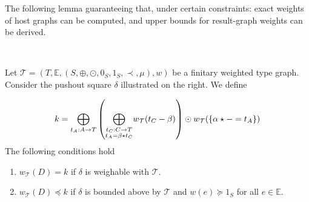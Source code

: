 The following lemma guaranteeing that, under certain constraints: exact weights of host graphs can be computed, and upper bounds for result-graph weights can be derived. 
\begin{lemma}
    \label{nwf:lem_4d13}
\ \newline
\begin{minipage}{0.7\textwidth}
    Let $\mathcal{T} = (T,\mathbb{E}, (S, \oplus, \odot, 0_S, 1_S, \prec, \mu), w)$ be a finitary weighted type graph. Consider the pushout square $\delta$ illustrated on the right. We define
\end{minipage}
\begin{minipage}{0.3\textwidth}
    \begin{center}{\normalfont
    }\end{center}
\end{minipage}
     \[k = \underset{t_A:A \rightarrow T}{\bigoplus}
            \left ( 
                \underset{\substack{t_C:C \rightarrow T\\
                                            t_A = \beta \star t_C }}{\bigoplus}
                        w_\mathcal{T}(t_C - \beta)     
                 \right ) 
            \odot 
                w_\mathcal{T}(\{\alpha \star - = t_A\})
    \]
    The following conditions hold
    \begin{enumerate}[label=(\Alph*)]
        \item  $w_\mathcal{T}(D)=k$ if $\delta$ is weighable with $\mathcal{T}$.
        \item  $w_\mathcal{T}(D)\preceq k$ if $\delta$ is bounded above by $\mathcal{T}$  and \(w(e) \succeq 1_S\) for all $e \in \mathbb{E}$.
    \end{enumerate}
\end{lemma}

